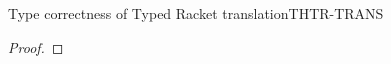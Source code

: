 \documentclass[acmlarge, anonymous, authordraft, review]{acmart} %
\begin{document}
\begin{lemma}{Type correctness of Typed Racket translation}{THTR-TRANS}
  \begin{conds}
    \cond{$\TR\K = \Kp$}
    \cond{$\TR\Env = \Envp$}
  \end{conds}

  \then\axiom{$\EnvType\Envp\cdot\Kp{\TRG{\e}\Env}{\t}$}

  \begin{proof} \indmsg{\EnvTypeW\Env\K\e\t}

% 
% 
% 

\end{proof}
\end{lemma}
\end{document}
